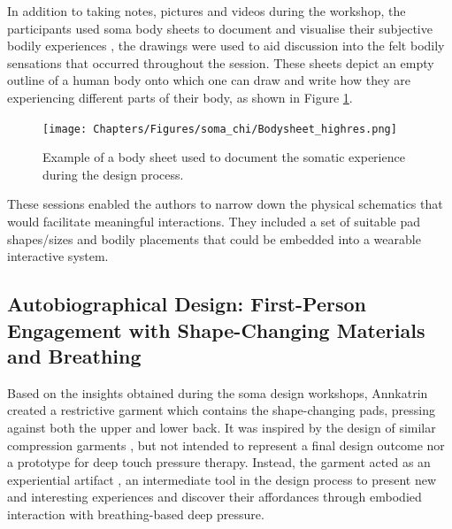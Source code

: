 In addition to taking notes, pictures and videos during the workshop, the participants used soma body sheets to document and visualise their subjective bodily experiences \cite{candy_intimate_2014}, the drawings were used to aid discussion into the felt bodily sensations that occurred throughout the session. These sheets depict an empty outline of a human body onto which one can draw and write how they are experiencing different parts of their body, as shown in Figure \ref{fig:bodysheets}.

\begin{figure}[b]
  \centering
  \texttt{[image: Chapters/Figures/soma\_chi/Bodysheet\_highres.png]}
  \caption[Example of a body sheet]{Example of a body sheet used to document the somatic experience during the design process.}
  \label{fig:bodysheets}
\end{figure}

These sessions enabled the authors to narrow down the physical schematics that would facilitate meaningful interactions. They included a set of suitable pad shapes/sizes and bodily placements that could be embedded into a wearable interactive system.

\subsection{Autobiographical Design: First-Person Engagement with Shape-Changing Materials and Breathing}
\label{sec:first_person_engagement}

Based on the insights obtained during the soma design workshops, Annkatrin created a restrictive garment which contains the shape-changing pads, pressing against both the upper and lower back. It was inspired by the design of similar compression garments \cite{vaucelle_design_2009, foo_user_2019}, but not intended to represent a final design outcome nor a prototype for deep touch pressure therapy. Instead, the garment acted as an experiential artifact \cite{sundstrom_experiential_2011}, an intermediate tool in the design process to present new and interesting experiences and discover their affordances through embodied interaction with breathing-based deep pressure.

